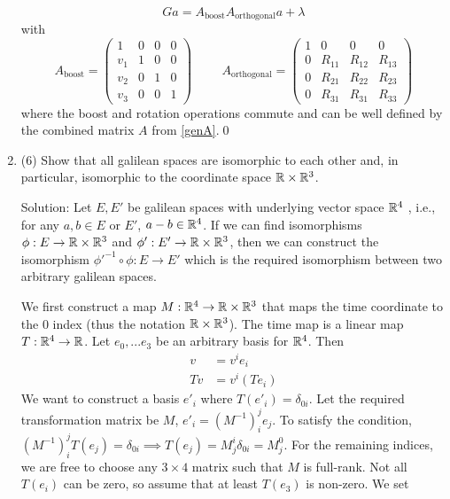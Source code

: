 \begin{enumerate}
\begin{equation}
	G a  = A_\mathrm{boost}A_\mathrm{orthogonal} a + \lambda
\end{equation}
with \begin{equation}\label{key}
	 A_{\mathrm{boost}} = \begin{pmatrix}
	 	1 & 0 & 0 & 0\\
	 	v_1&1& 0& 0\\
	 	v_2&0&1 &0 \\
	 	v_3&0& 0& 1
	 \end{pmatrix}\hspace{1cm} A_{\mathrm{orthogonal}} = \begin{pmatrix}
	 1 & 0 & 0 & 0\\
	 0&R_{11}& R_{12}& R_{13}\\
	 0&R_{21}&R_{22} &R_{23} \\
	 0&R_{31}& R_{31}& R_{33}
 \end{pmatrix}
\end{equation}
where the boost and rotation operations commute and can be well defined by the combined matrix $A$ from \eqref{genA}.\qed
\item (6) Show that all galilean spaces are isomorphic to each other and, in particular, isomorphic to the coordinate space $\mathbb{R}\times\mathbb{R}^3$.\par
Solution: Let $E, E'$ be galilean spaces with underlying vector space $\mathbb{R}^4$ , i.e., for any $a,b\in E$ or $E'$, $a-b\in \mathbb{R}^4$. If we can find isomorphisms $\phi:E\rightarrow \mathbb{R}\times\mathbb{R}^3$ and $\phi':E'\rightarrow \mathbb{R}\times\mathbb{R}^3$, then we can construct the isomorphism $\phi'^{-1}\circ\phi:E\rightarrow E'$ which is the required isomorphism between two arbitrary galilean spaces.\par
We first construct a map $M:\mathbb{R}^4\rightarrow\mathbb{R}\times\mathbb{R}^3$ that maps the time coordinate to the 0 index (thus the notation $\mathbb{R}\times \mathbb{R}^3$). The time map is a linear map $T:\mathbb{R}^4\rightarrow\mathbb{R}$. Let $e_0,...e_3$ be an arbitrary basis for $\mathbb{R}^4$. Then 
\begin{align}
	v &= v^ie_i\\
	Tv & = v^i (Te_i)
\end{align}
We want to construct a basis $e'_i$ where $T(e'_i) = \delta_{0i}$. Let the required transformation matrix be $M$, $ e'_i = (M^{-1})_i^{j}e_j $. To satisfy the condition, $(M^{-1})_i^{j} T(e_j) = \delta_{0i}\implies T(e_j) = M^i_j\delta_{0i} = M^0_j$. For the remaining indices, we are free to choose any $3\times 4$ matrix such that $M$ is full-rank. Not all $T(e_i)$ can be zero, so assume that at least $T(e_3)$ is non-zero. We set

\end{enumerate}
